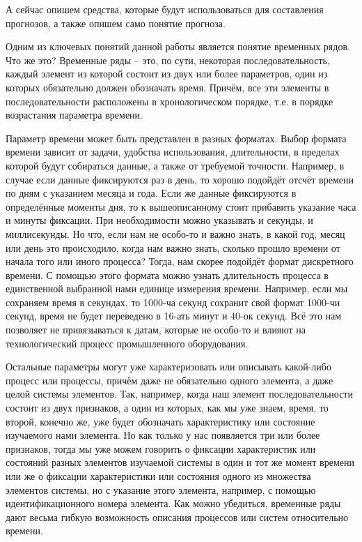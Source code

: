 {\gostFont

  \par \redline А сейчас опишем средства, которые будут использоваться для составления прогнозов, а также опишем само понятие прогноза.

  \par \redline Одним из ключевых понятий данной работы является понятие временных рядов. Что же это? Временные ряды {--} это, по сути, некоторая последовательность, каждый элемент из которой состоит из двух или более параметров, один из которых обязательно должен обозначать время. Причём, все эти элементы в последовательности расположены в хронологическом порядке, т.е. в порядке возрастания параметра времени. 

  \par \redline Параметр времени может быть представлен в разных форматах. Выбор формата времени зависит от задачи, удобства использования, длительности, в пределах которой будут собираться данные, а также от требуемой точности. Например, в случае если данные фиксируются раз в день, то хорошо подойдёт отсчёт времени по дням с указанием месяца и года. Если же данные фиксируются в определённые моменты дня, то к вышеописанному стоит прибавить указание часа и минуты фиксации. При необходимости можно указывать и секунды, и миллисекунды. Но что, если нам не особо-то и важно знать, в какой год, месяц или день это происходило, когда нам важно знать, сколько прошло времени от начала того или иного процесса? Тогда, нам скорее подойдёт формат дискретного времени. С помощью этого формата можно узнать длительность процесса в единственной выбранной нами единице измерения времени. Например, если мы сохраняем время в секундах, то 1000-ча секунд сохранит свой формат 1000-чи секунд, время не будет переведено в 16-ать минут и 40-ок секунд. Всё это нам позволяет не привязываться к датам, которые не особо-то и влияют на технологический процесс промышленного оборудования.

  \par \redline Остальные параметры могут уже характеризовать или описывать какой-либо процесс или процессы, причём даже не обязательно одного элемента, а даже целой системы элементов. Так, например, когда наш элемент последовательности состоит из двух признаков, а один из которых, как мы уже знаем, время, то второй, конечно же, уже будет обозначать характеристику или состояние изучаемого нами элемента. Но как только у нас появляется три или более признаков, тогда мы уже можем говорить о фиксации характеристик или состояний разных элементов изучаемой системы в один и тот же момент времени или же о фиксации характеристики или состояния одного из множества элементов системы, но с указание этого элемента, например, с помощью идентификационного номера элемента. Как можно убедиться, временные ряды дают весьма гибкую возможность описания процессов или систем относительно времени. 

}
